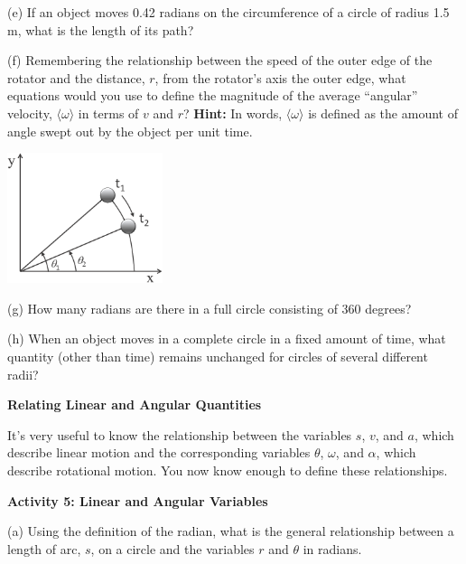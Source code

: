 (e) If an object moves 0.42 radians on the circumference of a circle of radius
1.5 m, what is the length of its path?
\answerspace{20mm}

\pagebreak[3]

(f) Remembering the relationship between the speed of the outer edge of the
rotator and the distance, $r$, 
from the rotator's axis the outer edge, what equations
would you use to define the magnitude of the average ``angular''
velocity, \( \langle\omega \rangle \) in terms of $v$ and $r$? \textbf{Hint:} In words, 
\( \langle\omega \rangle \) is defined
as the amount of angle swept out by the object per unit time. 

\vspace{0.3cm}
{\par\raggedright \includegraphics[height=1.5in]{rotation/rotation_fig8_new.eps} \par}
\vspace{0.3cm}

(g) How many radians are there in a full circle consisting of 360 degrees?
\vspace{10mm}

(h) When an object moves in a complete circle in a fixed amount of time, what
quantity (other than time) remains unchanged for circles of several different
radii? 
\vspace{10mm}

\textbf{Relating Linear and Angular Quantities} 

It's very useful to know the relationship between the variables 
$s$, $v$, and $a$,
which describe linear motion and the corresponding variables \( \theta  \),
\( \omega  \), and \( \alpha  \), which describe rotational motion. You now
know enough to define these relationships.

\textbf{Activity 5: Linear and Angular Variables }

(a) Using the definition of the radian, what is the general relationship between
a length of arc, $s$, on a circle and the variables 
$r$ and \( \theta  \) in radians. 
\vspace{10mm}

